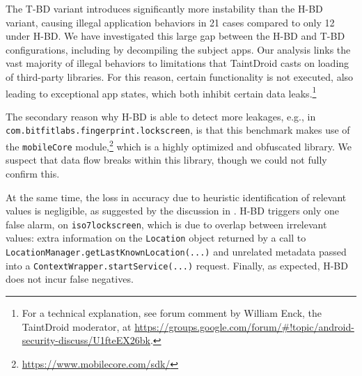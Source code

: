 
The T-BD variant introduces significantly more instability than the H-BD variant, causing illegal application behaviors in 21 cases compared to only 12 under H-BD. We have investigated this large gap between the H-BD and T-BD configurations, including by decompiling the subject apps. Our analysis links the vast majority of illegal behaviors to limitations that
TaintDroid casts on loading of third-party libraries. For this reason, certain functionality is not executed, also leading to exceptional app states, which both inhibit certain data leaks.\footnote{
	For a technical explanation, see forum comment by William Enck, the TaintDroid moderator, at \href{https://groups.google.com/forum/\#!topic/android-security-discuss/U1fteEX26bk}{https://groups.google.com/forum/\#!topic/android-security-discuss/U1fteEX26bk}.
}

The secondary reason why H-BD is able to detect more leakages, e.g., in {\tt com.bitfitlabs.fingerprint.lockscreen}, is that this benchmark makes use of the {\tt mobileCore} module,\footnote{
\href{https://www.mobilecore.com/sdk/}{https://www.mobilecore.com/sdk/}
} which is a highly optimized and obfuscated library. We suspect that data flow breaks within this library, though we could not fully confirm this.

At the same time, the loss in accuracy due to heuristic identification of relevant values is negligible, as suggested by the discussion in . H-BD triggers only one false alarm, on {\tt iso7lockscreen},
which is due to overlap between irrelevant values: extra information on the {\tt Location} object returned by a call to {\tt LocationManager.getLastKnownLocation(...)} and unrelated metadata passed into a {\tt ContextWrapper.startService(...)} request.  Finally, as expected, H-BD does not incur false negatives.